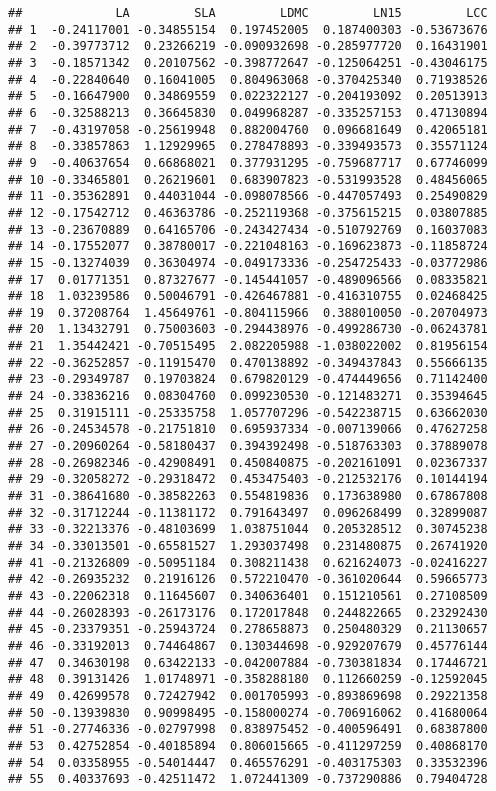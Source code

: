 \documentclass[
]{book}
\begin{document}
\begin{verbatim}
##             LA         SLA         LDMC         LN15         LCC
## 1  -0.24117001 -0.34855154  0.197452005  0.187400303 -0.53673676
## 2  -0.39773712  0.23266219 -0.090932698 -0.285977720  0.16431901
## 3  -0.18571342  0.20107562 -0.398772647 -0.125064251 -0.43046175
## 4  -0.22840640  0.16041005  0.804963068 -0.370425340  0.71938526
## 5  -0.16647900  0.34869559  0.022322127 -0.204193092  0.20513913
## 6  -0.32588213  0.36645830  0.049968287 -0.335257153  0.47130894
## 7  -0.43197058 -0.25619948  0.882004760  0.096681649  0.42065181
## 8  -0.33857863  1.12929965  0.278478893 -0.339493573  0.35571124
## 9  -0.40637654  0.66868021  0.377931295 -0.759687717  0.67746099
## 10 -0.33465801  0.26219601  0.683907823 -0.531993528  0.48456065
## 11 -0.35362891  0.44031044 -0.098078566 -0.447057493  0.25490829
## 12 -0.17542712  0.46363786 -0.252119368 -0.375615215  0.03807885
## 13 -0.23670889  0.64165706 -0.243427434 -0.510792769  0.16037083
## 14 -0.17552077  0.38780017 -0.221048163 -0.169623873 -0.11858724
## 15 -0.13274039  0.36304974 -0.049173336 -0.254725433 -0.03772986
## 17  0.01771351  0.87327677 -0.145441057 -0.489096566  0.08335821
## 18  1.03239586  0.50046791 -0.426467881 -0.416310755  0.02468425
## 19  0.37208764  1.45649761 -0.804115966  0.388010050 -0.20704973
## 20  1.13432791  0.75003603 -0.294438976 -0.499286730 -0.06243781
## 21  1.35442421 -0.70515495  2.082205988 -1.038022002  0.81956154
## 22 -0.36252857 -0.11915470  0.470138892 -0.349437843  0.55666135
## 23 -0.29349787  0.19703824  0.679820129 -0.474449656  0.71142400
## 24 -0.33836216  0.08304760  0.099230530 -0.121483271  0.35394645
## 25  0.31915111 -0.25335758  1.057707296 -0.542238715  0.63662030
## 26 -0.24534578 -0.21751810  0.695937334 -0.007139066  0.47627258
## 27 -0.20960264 -0.58180437  0.394392498 -0.518763303  0.37889078
## 28 -0.26982346 -0.42908491  0.450840875 -0.202161091  0.02367337
## 29 -0.32058272 -0.29318472  0.453475403 -0.212532176  0.10144194
## 31 -0.38641680 -0.38582263  0.554819836  0.173638980  0.67867808
## 32 -0.31712244 -0.11381172  0.791643497  0.096268499  0.32899087
## 33 -0.32213376 -0.48103699  1.038751044  0.205328512  0.30745238
## 34 -0.33013501 -0.65581527  1.293037498  0.231480875  0.26741920
## 41 -0.21326809 -0.50951184  0.308211438  0.621624073 -0.02416227
## 42 -0.26935232  0.21916126  0.572210470 -0.361020644  0.59665773
## 43 -0.22062318  0.11645607  0.340636401  0.151210561  0.27108509
## 44 -0.26028393 -0.26173176  0.172017848  0.244822665  0.23292430
## 45 -0.23379351 -0.25943724  0.278658873  0.250480329  0.21130657
## 46 -0.33192013  0.74464867  0.130344698 -0.929207679  0.45776144
## 47  0.34630198  0.63422133 -0.042007884 -0.730381834  0.17446721
## 48  0.39131426  1.01748971 -0.358288180  0.112660259 -0.12592045
## 49  0.42699578  0.72427942  0.001705993 -0.893869698  0.29221358
## 50 -0.13939830  0.90998495 -0.158000274 -0.706916062  0.41680064
## 51 -0.27746336 -0.02797998  0.838975452 -0.400596491  0.68387800
## 53  0.42752854 -0.40185894  0.806015665 -0.411297259  0.40868170
## 54  0.03358955 -0.54014447  0.465576291 -0.403175303  0.33532396
## 55  0.40337693 -0.42511472  1.072441309 -0.737290886  0.79404728
\end{verbatim}
\end{document}
